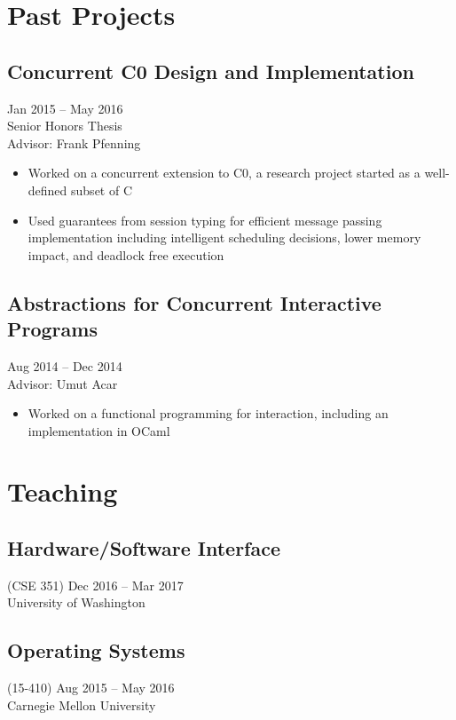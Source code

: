 \documentclass{article}
\begin{document}
\section{Past Projects}

\subsection{Concurrent C0 Design and Implementation}
\hfill Jan 2015 -- May 2016 \\
Senior Honors Thesis \\
Advisor: Frank Pfenning
\begin{itemize}
\item Worked on a concurrent extension to C0, a research project started as a well-defined subset of C
\item Used guarantees from session typing for efficient message passing implementation including intelligent scheduling decisions, lower memory impact, and deadlock free execution
\end{itemize}

\subsection{Abstractions for Concurrent Interactive Programs}
\hfill Aug 2014 -- Dec 2014 \\
Advisor: Umut Acar
\begin{itemize}
\item Worked on a functional programming for interaction, including an implementation in OCaml
\end{itemize}


\section{Teaching}

\subsection{Hardware/Software Interface} (CSE 351)
\hfill Dec 2016 -- Mar 2017\\
University of Washington

\subsection{Operating Systems} (15-410)
\hfill Aug 2015 -- May 2016 \\
Carnegie Mellon University
\end{document}
